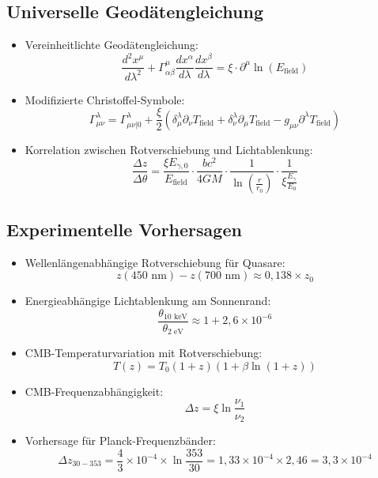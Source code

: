 \documentclass[12pt,a4paper]{article}
\begin{document}
	\subsection{Universelle Geod\"{a}tengleichung}
	\begin{itemize}
		\item Vereinheitlichte Geod\"{a}tengleichung:
		$$\boxed{\frac{d^2 x^\mu}{d\lambda^2} + \Gamma^\mu_{\alpha\beta}\frac{dx^\alpha}{d\lambda}\frac{dx^\beta}{d\lambda} = \xi \cdot \partial^\mu \ln(E_{\text{field}})}$$
		
		\item Modifizierte Christoffel-Symbole:
		$$\Gamma^\lambda_{\mu\nu} = \Gamma^\lambda_{\mu\nu|0} + \frac{\xi}{2} \left(\delta^\lambda_\mu \partial_\nu T_{\text{field}} + \delta^\lambda_\nu \partial_\mu T_{\text{field}} - g_{\mu\nu} \partial^\lambda T_{\text{field}}\right)$$
		
		\item Korrelation zwischen Rotverschiebung und Lichtablenkung:
		$$\frac{\Delta z}{\Delta \theta} = \frac{\xi E_{\gamma,0}}{E_{\text{field}}} \cdot \frac{bc^2}{4GM} \cdot \frac{1}{\ln\left(\frac{r}{r_0}\right)} \cdot \frac{1}{\xi \frac{E_\gamma}{E_0}}$$
	\end{itemize}
	
	\subsection{Experimentelle Vorhersagen}
	\begin{itemize}
		\item Wellenl\"{a}ngenabh\"{a}ngige Rotverschiebung f\"{u}r Quasare:
		$$z(450\text{ nm}) - z(700\text{ nm}) \approx 0,138 \times z_0$$
		
		\item Energieabh\"{a}ngige Lichtablenkung am Sonnenrand:
		$$\frac{\theta_{10\text{ keV}}}{\theta_{2\text{ eV}}} \approx 1 + 2,6 \times 10^{-6}$$
		
		\item CMB-Temperaturvariation mit Rotverschiebung:
		$$T(z) = T_0(1+z)\left(1 + \beta \ln(1+z)\right)$$
		
		\item CMB-Frequenzabh\"{a}ngigkeit:
		$$\Delta z = \xi \ln\frac{\nu_1}{\nu_2}$$
		
		\item Vorhersage f\"{u}r Planck-Frequenzb\"{a}nder:
		$$\Delta z_{30-353} = \frac{4}{3} \times 10^{-4} \times \ln\frac{353}{30} = 1,33 \times 10^{-4} \times 2,46 = 3,3 \times 10^{-4}$$
	\end{itemize}
	
\end{document}

